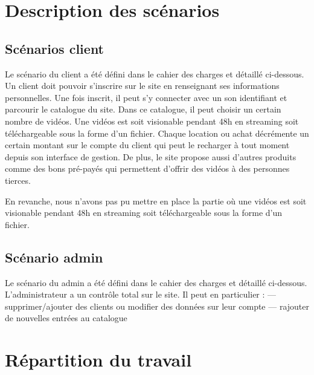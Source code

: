 \documentclass[a4paper,10pt]{report}
\begin{document}
\chapter{Description des scénarios}

\section{Scénarios client}

Le scénario du client a été défini dans le cahier des charges et détaillé ci-dessous.
Un client doit pouvoir s’inscrire sur le site en renseignant ses informations personnelles. Une fois inscrit, il peut s’y connecter avec un son identifiant et parcourir le catalogue du site. Dans ce catalogue, il peut choisir un certain nombre de vidéos. Une vidéos est soit visionable pendant 48h en streaming soit téléchargeable sous la forme d’un fichier. Chaque location ou achat décrémente un certain montant sur le compte du client qui peut le recharger à tout moment depuis son interface de gestion. De plus, le site propose aussi d’autres produits comme des bons pré-payés qui permettent d’offrir des vidéos à des personnes tierces.

En revanche, nous n'avons pas pu mettre en place la partie où une vidéos est soit visionable pendant 48h en streaming soit téléchargeable sous la forme d’un fichier.

\section{Scénario admin}

Le scénario du admin a été défini dans le cahier des charges et détaillé ci-dessous.
L’administrateur a un contrôle total sur le site. Il peut en particulier :
— supprimer/ajouter des clients ou modifier des données sur leur compte 
— rajouter de nouvelles entrées au catalogue

\chapter{Répartition du travail}

\section{}

\subsection{}
\end{document}
